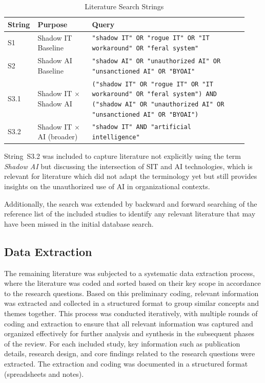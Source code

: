 \documentclass[12pt,oneside]{article}
\begin{document}
\begin{table}[ht]
\centering
\caption{Literature Search Strings}
\label{tab:search-strings}
\begin{tabular}{@{} p{0.08\linewidth} p{0.22\linewidth} p{0.63\linewidth} @{}}
\toprule
\textbf{String} & \textbf{Purpose} & \textbf{Query} \\
\midrule
S1 & Shadow IT Baseline &
  \texttt{"shadow IT" OR "rogue IT" OR "IT workaround" OR "feral system"} \\
\addlinespace
S2 & Shadow AI Baseline &
  \texttt{"shadow AI" OR "unauthorized AI" OR "unsanctioned AI" OR "BYOAI"} \\
\addlinespace
S3.1 & Shadow IT $\times$ Shadow AI &
  \texttt{("shadow IT" OR "rogue IT" OR "IT workaround" OR "feral system") AND ("shadow AI" OR "unauthorized AI" OR "unsanctioned AI" OR "BYOAI")} \\
\addlinespace
S3.2 & Shadow IT $\times$ AI (broader) &
  \texttt{"shadow IT" AND "artificial intelligence"} \\
\bottomrule
\end{tabular}
\end{table}

String~S3.2 was included to capture literature not explicitly using the term \emph{Shadow AI} but discussing the intersection of \ac{SIT} and \ac{AI} technologies, which is relevant for literature which did not adapt the terminology yet but still provides insights on the unauthorized use of \ac{AI} in organizational contexts.

Additionally, the search was extended by backward and forward searching of the reference list of the included studies to identify any relevant literature that may have been missed in the initial database search.

\subsection{Data Extraction} \label{data-extraction}

The remaining literature was subjected to a systematic data extraction process, where the literature was coded and sorted based on their key scope in accordance to the research questions. Based on this preliminary coding, relevant information was extracted and collected in a structured format to group similar concepts and themes together. This process was conducted iteratively, with multiple rounds of coding and extraction to ensure that all relevant information was captured and organized effectively for further analysis and synthesis in the subsequent phases of the review. For each included study, key information such as publication details, research design, and core findings related to the research questions were extracted. The extraction and coding was documented in a structured format (spreadsheets and notes).
\end{document}
